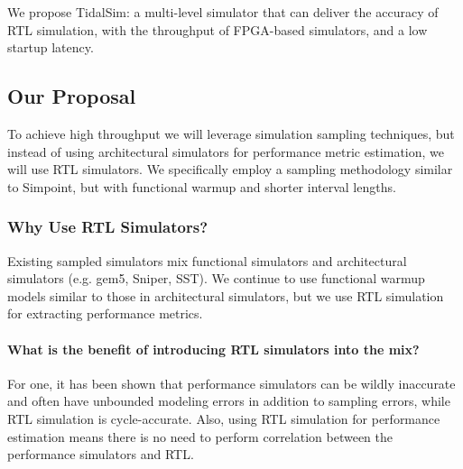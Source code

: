 \documentclass[sigplan,nonacm,10pt]{acmart}
\begin{document}
We propose TidalSim: a multi-level simulator that can deliver the accuracy of RTL simulation, with the throughput of FPGA-based simulators, and a low startup latency.

\subsection{Our Proposal}

To achieve high throughput we will leverage simulation sampling techniques, but instead of using architectural simulators for performance metric estimation, we will use RTL simulators.
We specifically employ a sampling methodology similar to Simpoint, but with functional warmup and shorter interval lengths.

\subsubsection{Why Use RTL Simulators?}


Existing sampled simulators mix functional simulators and architectural simulators (e.g. gem5, Sniper, SST).
We continue to use functional warmup models similar to those in architectural simulators, but we use RTL simulation for extracting performance metrics.

\paragraph{What is the benefit of introducing RTL simulators into the mix?}

For one, it has been shown that performance simulators can be wildly inaccurate\cite{arch_sim_considered_harmful, arch_sim_survey} and often have unbounded modeling errors in addition to sampling errors, while RTL simulation is cycle-accurate.
Also, using RTL simulation for performance estimation means there is no need to perform correlation between the performance simulators and RTL.
\end{document}
